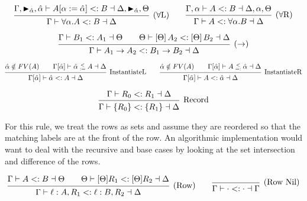 \documentclass{article}
\newcommand{\spc}{\qquad}
\newcommand{\lbl}{\ell}
\newcommand{\marker}[1]{\RHD_{#1}}
\newcommand{\ev}{\hat}
\newcommand{\evar}[1][]{\ev \upalpha_{#1}}
\newcommand{\evaralt}{\ev \upbeta}
\newcommand{\ctxinout}[3]{#1 \vdash #2 \dashv #3}
\newcommand{\subsume}{<:}
\newcommand{\subsumes}[4]{\ctxinout {#1} {#2 \subsume #3} {#4}}
\newcommand{\instLSymbol}{\;\substack{<\\:=}\;}
\newcommand{\instRSymbol}{\;\substack{<\\=:}\;}
\newcommand{\apply}[1]{\left[#1\right]}
\newcommand{\instL}[4]{#1 \vdash #2 \instLSymbol #3 \dashv #4}
\newcommand{\instR}[4]{#1 \vdash #2 \instRSymbol #3 \dashv #4}
\newcommand{\deduct}[3][]
{
  \begin{prooftree}
    \hypo{#2}
    \infer1[\text{#1}]{#3}
  \end{prooftree}
}
\begin{document}
\[
  \deduct[(\(\forall\)L)]
  { \subsumes{\Gamma, \marker{\ev\alpha}, \ev\alpha}{A[\alpha := \ev\alpha]}{B}{\Delta, \marker{\ev\alpha}, \Theta} }
  { \subsumes{\Gamma}{\forall \alpha. A}{B}{\Delta} }
  \spc
  \deduct[(\(\forall\)R)]
  { \subsumes{\Gamma, \alpha}{A}{B}{\Delta, \alpha, \Theta} }
  { \subsumes{\Gamma}{A}{\forall \alpha. B}{\Delta} }
\]

\[
  \deduct[(\(\to\))]
  { \subsumes{\Gamma}{B_1}{A_1}{\Theta} \spc \subsumes{\Theta}{\apply\Theta A_2}{\apply\Theta B_2}{\Delta} }
  { \subsumes{\Gamma}{A_1 \to A_2}{B_1 \to B_2}{\Delta} }
\]

\[
  \deduct[InstantiateL]
  {\ev \alpha \notin FV(A) \spc \instL{\Gamma[\ev \alpha]}{\ev
      \alpha}{A}{\Delta}}
  {\subsumes{\Gamma[\ev \alpha]}{\ev \alpha}{A}{\Delta}}
  \spc
  \deduct[InstantiateR]
  {\ev \alpha \notin FV(A) \spc \instR{\Gamma[\ev \alpha]}{A}{\ev
      \alpha}{\Delta}}
  {\subsumes{\Gamma[\ev \alpha]}{A}{\ev \alpha}{\Delta}}
\]

\[
  \deduct[Record]{\subsumes{\Gamma}{R_0}{R_1}{\Delta}}{\subsumes{\Gamma}{\{R_0\}}{\{R_1\}}{\Delta}}
\]

For this rule, we treat the rows as sets and assume they are reordered so that
the matching labels are at the front of the row. An algorithmic implementation
would want to deal with the recursive and base cases by looking at the set
intersection and difference of the rows.

\[
  \deduct[(Row)]
  {\subsumes{\Gamma}{A}{B}{\Theta}
    \spc
    \subsumes{\Theta}{[\Theta] R_1}{[\Theta] R_2}{\Delta}
  }
  { \subsumes{\Gamma}{\lbl : A, R_1}{\lbl : B, R_2}{\Delta} }
  \spc
  \deduct[(Row Nil)]{}{ \subsumes{\Gamma}{\cdot}{\cdot}{\Gamma} }
\]


\end{document}
